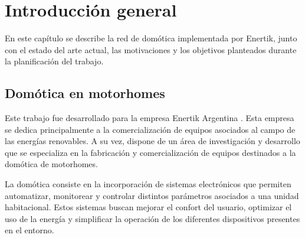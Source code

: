 
\chapter{Introducción general} %

\label{Chapter1} %
\label{IntroGeneral}

En este capítulo se describe la red de domótica implementada por Enertik, junto con el estado del arte actual, las motivaciones y los objetivos planteados durante la planificación del trabajo.


\newcommand{\keyword}[1]{\textbf{#1}}
\newcommand{\tabhead}[1]{\textbf{#1}}
\newcommand{\code}[1]{\texttt{#1}}
\newcommand{\file}[1]{\texttt{\bfseries#1}}
\newcommand{\option}[1]{\texttt{\itshape#1}}
\newcommand{\grados}{$^{\circ}$}



\section{Domótica en motorhomes}
\label{sec:1_1}
Este trabajo fue desarrollado para la empresa Enertik Argentina \citep{web_enertik}. 
Esta empresa se dedica principalmente a la comercialización de equipos asociados al 
campo de las energías renovables. A su vez, dispone de un área de investigación y 
desarrollo que se especializa en la fabricación y comercialización de equipos 
destinados a la domótica de motorhomes.

La domótica consiste en la incorporación de sistemas electrónicos que permiten automatizar, monitorear y controlar distintos parámetros asociados a una unidad habitacional. Estos sistemas buscan mejorar el confort del usuario, optimizar el uso de la energía y simplificar la operación de los diferentes dispositivos presentes en el entorno.

